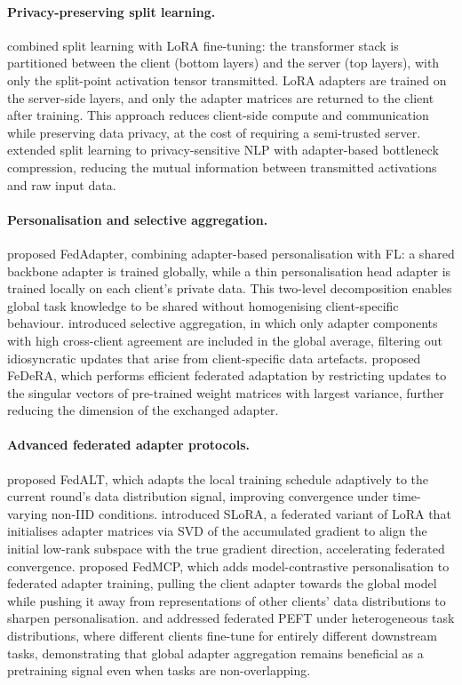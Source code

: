 \paragraph{Privacy-preserving split learning.}
\citet{LinSplitLoRA2024} combined split learning with LoRA fine-tuning: the transformer
stack is partitioned between the client (bottom layers) and the server (top layers), with
only the split-point activation tensor transmitted. LoRA adapters are trained on the
server-side layers, and only the adapter matrices are returned to the client after
training. This approach reduces client-side compute and communication while preserving
data privacy, at the cost of requiring a semi-trusted server. \citet{ZhangPrivacySplit2023}
extended split learning to privacy-sensitive NLP with adapter-based bottleneck compression,
reducing the mutual information between transmitted activations and raw input data.

\paragraph{Personalisation and selective aggregation.}
\citet{CaiFedAdapter2023} proposed FedAdapter, combining adapter-based personalisation
with FL: a shared backbone adapter is trained globally, while a thin personalisation
head adapter is trained locally on each client's private data. This two-level
decomposition enables global task knowledge to be shared without homogenising
client-specific behaviour. \citet{GuoSelective2025} introduced selective aggregation,
in which only adapter components with high cross-client agreement are included in the
global average, filtering out idiosyncratic updates that arise from client-specific
data artefacts. \citet{YanFeDeRA2024} proposed FeDeRA, which performs efficient
federated adaptation by restricting updates to the singular vectors of pre-trained
weight matrices with largest variance, further reducing the dimension of the exchanged
adapter.

\paragraph{Advanced federated adapter protocols.}
\citet{BianFedALT2025} proposed FedALT, which adapts the local training schedule
adaptively to the current round's data distribution signal, improving convergence
under time-varying non-IID conditions. \citet{Babakniya2023} introduced SLoRA,
a federated variant of LoRA that initialises adapter matrices via SVD of the
accumulated gradient to align the initial low-rank subspace with the true gradient
direction, accelerating federated convergence. \citet{ZhaoFedMCP2024} proposed
FedMCP, which adds model-contrastive personalisation to federated adapter training,
pulling the client adapter towards the global model while pushing it away from
representations of other clients' data distributions to sharpen personalisation.
\citet{LiuAdaptive2024} and \citet{KooBai2025} addressed federated PEFT under
heterogeneous task distributions, where different clients fine-tune for entirely
different downstream tasks, demonstrating that global adapter aggregation remains
beneficial as a pretraining signal even when tasks are non-overlapping.

